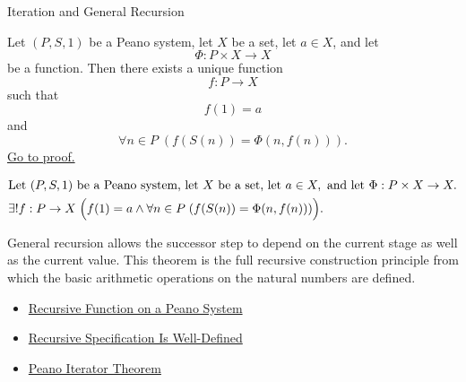 \begin{topicbox}{Iteration and General Recursion}
\begin{tcolorbox}[colback=thmbox, colframe=thmborder, arc=2pt,
  left=6pt, right=6pt, top=4pt, bottom=4pt,
  title={\small\textbf{Theorem (General Recursion Theorem for a Peano System)}},
  fonttitle=\small\bfseries]
\begin{theorem}
\label{thm:general-recursion-theorem-for-peano-system}
Let $(P,S,1)$ be a Peano system, let $X$ be a set, let $a \in X$, and let
\[
\Phi : P \times X \to X
\]
be a function. Then there exists a unique function
\[
f : P \to X
\]
such that
\[
f(1)=a
\]
and
\[
\forall n \in P\;(f(S(n))=\Phi(n,f(n))).
\]
\hyperref[prf-general-recursion-theorem-for-peano-system]{Go to proof.}
\end{theorem}
\end{tcolorbox}

\begin{remark*}
\[
\begin{aligned}
&\text{Let } (P,S,1) \text{ be a Peano system, let } X \text{ be a set, let } a \in X, \text{ and let } \Phi : P \times X \to X.\\
&\exists! f : P \to X\;
\Bigl(f(1)=a \land
\forall n \in P\;(f(S(n))=\Phi(n,f(n)))\Bigr).
\end{aligned}
\]
\end{remark*}

\begin{remark*}[Interpretation]
General recursion allows the successor step to depend on the current stage as
well as the current value. This theorem is the full recursive construction
principle from which the basic arithmetic operations on the natural numbers are
defined.
\end{remark*}

\begin{remark*}[Dependencies]
\begin{itemize}
  \item \hyperref[def:recursive-function-on-peano-system]{Recursive Function on a Peano System}
  \item \hyperref[thm:recursive-specification-well-defined]{Recursive Specification Is Well-Defined}
  \item \hyperref[thm:peano-iterator-theorem]{Peano Iterator Theorem}
\end{itemize}
\end{remark*}
\end{topicbox}
